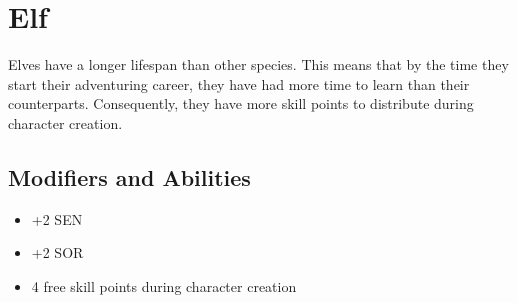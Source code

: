\section{Elf}\label{elf}
Elves have a longer lifespan than other species. This means that by the time
they start their adventuring career, they have had more time to learn than
their counterparts. Consequently, they have more skill points to distribute
during character creation.

\subsection{Modifiers and Abilities}
\begin{itemize}
    \item +2 SEN
    \item +2 SOR
    \item 4 free skill points during character creation
\end{itemize}
